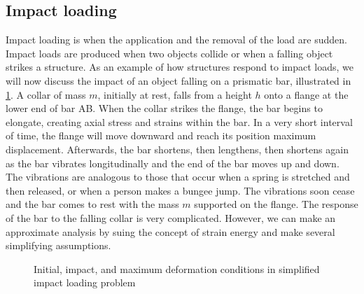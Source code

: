 \documentclass[
10pt,
a4paper,
openany,
svgnames,
]{book} %
\begin{document}
\subsection{Impact loading}

Impact loading is when the application and the removal of the load are sudden. Impact loads are produced when two objects collide or when a falling object strikes a structure. As an example of how structures respond to impact loads, we will now discuss the impact of an object falling on a prismatic bar, illustrated in \cref{fig: impact loading}. A collar of mass $m$, initially at rest, falls from a height $h$ onto a flange at the lower end of bar AB. When the collar strikes the flange, the bar begins to elongate, creating axial stress and strains within the bar. In a very short interval of time, the flange will move downward and reach its position maximum displacement. Afterwards, the bar shortens, then lengthens, then shortens again as the bar vibrates longitudinally and the end of the bar moves up and down. The vibrations are analogous to those that occur when a spring is stretched and then released, or when a person makes a bungee jump. The vibrations soon cease and the bar comes to rest with the mass $m$ supported on the flange. The response of the bar to the falling collar is very complicated. However, we can make an approximate analysis by suing the concept of strain energy and make several simplifying assumptions.

\begin{figure}[h]
  \centering
  \caption{Initial, impact, and maximum deformation conditions in simplified impact loading problem}
  \label{fig: impact loading}
  \end{figure}
\end{document}
